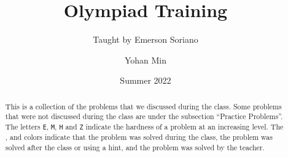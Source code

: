 \documentclass[11pt]{scrartcl}
\title{Olympiad Training}
\subtitle{Taught by Emerson Soriano}
\author{Yohan Min}
\date{Summer 2022}
\begin{document}
\maketitle

\begin{abstract}
	This is a collection of the problems that we discussed during the class. Some problems that were not discussed during the class are under the subsection ``Practice Problems''. The letters \verb|E|, \verb|M|, \verb|H| and \verb|Z| indicate the hardness of a problem at an increasing level. The ,  and  colors indicate that the problem was solved during the class, the problem was solved after the class or using a hint, and the problem was solved by the teacher.
\end{abstract}

\tableofcontents






\end{document}
